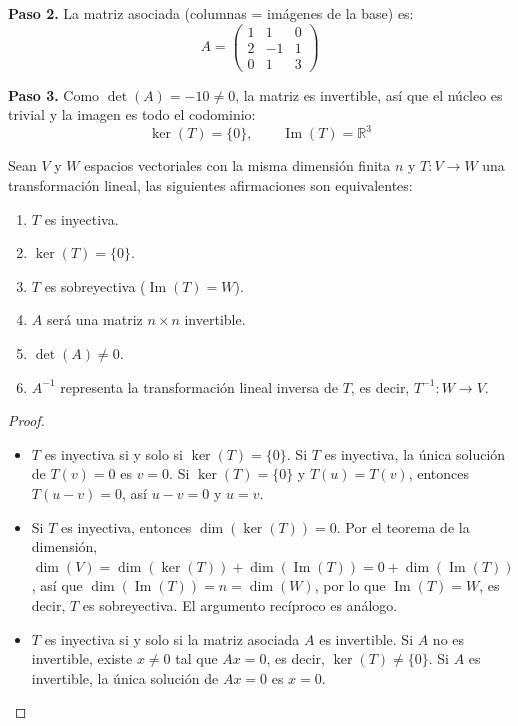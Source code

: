 \begin{example}
\begin{myproof}
\textbf{Paso 2.} La matriz asociada (columnas = imágenes de la base) es:
\[
A = \begin{pmatrix}
1 & 1 & 0 \\
2 & -1 & 1 \\
0 & 1 & 3
\end{pmatrix}
\]

\textbf{Paso 3.} Como $\det(A) = -10 \neq 0$, la matriz es invertible, así que el núcleo es trivial y la imagen es todo el codominio:
\[
\boxed{\ker(T) = \{0\}, \qquad \operatorname{Im}(T) = \mathbb{R}^3}
\]
\end{myproof}
\end{example}

\begin{theorem}
Sean $V$ y $W$ espacios vectoriales con la misma dimensión finita $n$ y $T: V \to W$ una transformación lineal, las siguientes afirmaciones son equivalentes:
\begin{enumerate}[1.]
    \item $T$ es inyectiva.
    \item $\ker(T) = \{0\}$.
    \item $T$ es sobreyectiva ($\operatorname{Im}(T) = W$).
    \item $A$ será una matriz $n \times n$ invertible.
    \item $\det(A) \neq 0$.
    \item $A^{-1}$ representa la transformación lineal inversa de $T$, es decir, $T^{-1}: W \to V$.
\end{enumerate}
\begin{proof}
\begin{itemize}
    \item[$1 \iff 2$:] $T$ es inyectiva si y solo si $\ker(T) = \{0\}$. Si $T$ es inyectiva, la única solución de $T(v) = 0$ es $v=0$. Si $\ker(T) = \{0\}$ y $T(u) = T(v)$, entonces $T(u-v) = 0$, así $u-v = 0$ y $u = v$.

    \item[$1 \implies 3$ y $3 \implies 1$ (cuando $\dim V = \dim W$):] Si $T$ es inyectiva, entonces $\dim(\ker(T)) = 0$. Por el teorema de la dimensión, $\dim(V) = \dim(\ker(T)) + \dim(\operatorname{Im}(T)) = 0 + \dim(\operatorname{Im}(T))$, así que $\dim(\operatorname{Im}(T)) = n = \dim(W)$, por lo que $\operatorname{Im}(T) = W$, es decir, $T$ es sobreyectiva. El argumento recíproco es análogo.

    \item[$1 \iff 4$:] $T$ es inyectiva si y solo si la matriz asociada $A$ es invertible. Si $A$ no es invertible, existe $x \neq 0$ tal que $Ax = 0$, es decir, $\ker(T) \neq \{0\}$. Si $A$ es invertible, la única solución de $Ax = 0$ es $x = 0$.


\end{itemize}
\end{proof}
\end{theorem}
